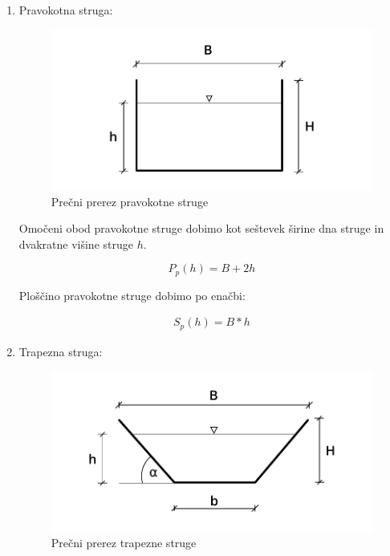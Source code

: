 \begin{enumerate}
	\item Pravokotna struga:
	
	\begin{figure}[ht!]
		\begin{centering}
			\includegraphics{slike/konsumpcijska_krivulja/rectangularChannel.pdf}		
			\caption{Prečni prerez pravokotne struge}\label{fig:pravokotna struga}
		\end{centering}
	\end{figure}
	

	Omočeni obod pravokotne struge dobimo kot seštevek širine dna struge in dvakratne višine struge $h$.
	
	\begin{ceqn}
	\begin{equation}
	P_{p}(h) = B + 2h
	\end{equation}
	\end{ceqn}
	
	Ploščino pravokotne struge dobimo po enačbi:
	
	\begin{ceqn}
	\begin{align}
	S_{p}(h) = B * h
	\end{align}
	\end{ceqn}
	
	\item Trapezna struga:
	
		\begin{figure}[ht!]
			\begin{centering}
				\includegraphics{slike/konsumpcijska_krivulja/trapezoidChannel.pdf}		
				\caption{Prečni prerez trapezne struge}\label{fig:trapezna struga}
			\end{centering}
		\end{figure}
	

\end{enumerate}
